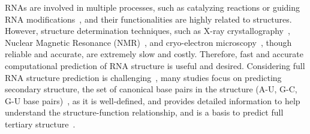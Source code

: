 RNAs
are involved in multiple processes, 
such as catalyzing reactions or guiding RNA modifications~\cite{Eddy:2001,Doudna+Cech:2002,Bachellerie+:2002}, 
and their functionalities are highly related to structures.
However, 
structure determination techniques, such as X-ray crystallography~\cite{Zhang+Adrian:2014}, 
Nuclear Magnetic Resonance (NMR)~\cite{Zhang+Keane:2019}, 
and 
cryo-electron microscopy~\cite{Lyumkis:2019}, 
though reliable and accurate,
are extremely slow and costly.
Therefore,
fast and accurate computational prediction of RNA structure is useful and desired. %
Considering full RNA %
structure prediction is challenging~\cite{Miao+:2017},
many studies focus on predicting secondary structure,
the set of canonical base pairs in the structure 
(A-U, G-C, G-U base pairs)~\cite{Tinoco+Bustamante:1999},
as it is well-defined, 
and provides detailed information to help understand 
the structure-function relationship, and
is a basis to predict full tertiary structure~\cite{Flores+Altman:2010,Seetin+Mathews:2011}.

